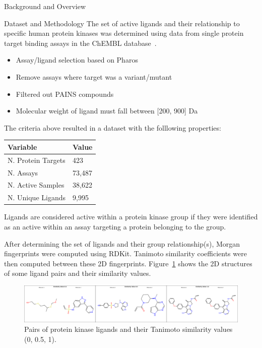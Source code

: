 \documentclass[final]{beamer}
\newlength{\colwidth}
\begin{document}
\begin{frame}[t]
\begin{columns}[t]
\begin{column}{\colwidth}
\begin{block}{Background and Overview}
  \end{block}

  \begin{block}{Dataset and Methodology}
    \small
    The set of active ligands and their relationship to specific human protein kinases was determined using data from single protein target binding assays in the ChEMBL database~\cite{chembl_db_2023}. 
    \begin{itemize}
        \item Assay/ligand selection based on Pharos~\cite{pharos_2022}
        \item Remove assays where target was a variant/mutant
        \item Filtered out PAINS compounds~\cite{baell_holloway_2010}
        \item Molecular weight of ligand must fall between [200, 900] Da
    \end{itemize}

    The criteria above resulted in a dataset with the folllowing properties:

    \begin{table}[!ht]
    \centering
    \small
    \begin{tabular}{l|l}
        \hline
        \textbf{Variable} & \textbf{Value} \\ \hline
        N. Protein Targets & 423 \\ \hline
        N. Assays & 73,487 \\ \hline
        N. Active Samples & 38,622 \\ \hline
        N. Unique Ligands & 9,995 \\ \hline
    \end{tabular}
    \end{table}

    Ligands are considered active within a protein kinase group if they were identified as an active within an assay targeting a protein belonging to the group. 

    After determining the set of ligands and their group relationship(s), Morgan fingerprints were computed using RDKit. Tanimoto similarity coefficients were then computed between these 2D fingerprints. Figure~\ref{ligand_sim} shows the 2D structures of some ligand pairs and their similarity values.
\begin{figure}
    \centering
    \includegraphics[width=\textwidth]{../figures/ligand_sim.png}
    \caption{Pairs of protein kinase ligands and their Tanimoto similarity values (0, 0.5, 1).}
    \label{ligand_sim}
\end{figure}


\end{block}
\end{column}
\end{columns}
\end{frame}
\end{document}
